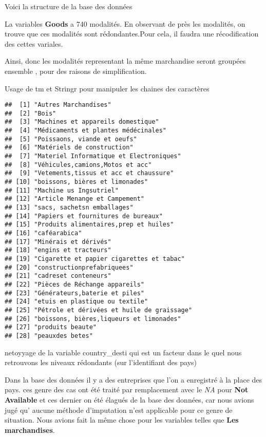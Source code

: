 \documentclass[
]{book}
\begin{document}
Voici la structure de la base des données

La variables \textbf{Goods } a 740 modalités. En observant de près les modalités, on trouve que ces modalités sont rédondantes.Pour cela, il faudra une récodification des cettes variales.

Ainsi, donc les modalités representant la même marchandise seront groupées ensemble , pour des raisons de simplification.

Usage de tm et Stringr pour manipuler les chaines des caractères

\begin{verbatim}
##  [1] "Autres Marchandises"                      
##  [2] "Bois"                                     
##  [3] "Machines et appareils domestique"         
##  [4] "Médicaments et plantes médécinales"       
##  [5] "Poissaons, viande et oeufs"               
##  [6] "Matériels de construction"                
##  [7] "Materiel Informatique et Electroniques"   
##  [8] "Véhicules,camions,Motos et acc"           
##  [9] "Vetements,tissus et acc et chaussure"     
## [10] "boissons, bières et limonades"            
## [11] "Machine us Ingsutriel"                    
## [12] "Article Menange et Campement"             
## [13] "sacs, sachetsn emballages"                
## [14] "Papiers et fournitures de bureaux"        
## [15] "Produits alimentaires,prep et huiles"     
## [16] "caféarabica"                              
## [17] "Minérais et dérivés"                      
## [18] "engins et tracteurs"                      
## [19] "Cigarette et papier cigarettes et tabac"  
## [20] "constructionprefabriquees"                
## [21] "cadreset conteneurs"                      
## [22] "Pièces de Réchange appareils"             
## [23] "Générateurs,baterie et piles"             
## [24] "etuis en plastique ou textile"            
## [25] "Pétrole et dérivées et huile de graissage"
## [26] "boissons, bières,liqueurs et limonades"   
## [27] "produits beaute"                          
## [28] "peauxdes betes"
\end{verbatim}

netoyyage de la variable country\_desti qui est un facteur dans le quel nous retrouvons les niveaux rédondants (sur l'identifiant des pays)

Dans la base des données il y a des entreprises que l'on a enregistré à la place des pays. ces genre des cas ont été traité par remplacement avec le \emph{NA} pour \textbf{Not Available} et ces dernier on été élagués de la base des données, car nous avions jugé qu' aucune méthode d'imputation n'est applicable pour ce genre de situation. Nous avions fait la même chose pour les variables telles que \textbf{Les marchandises}.
\end{document}
